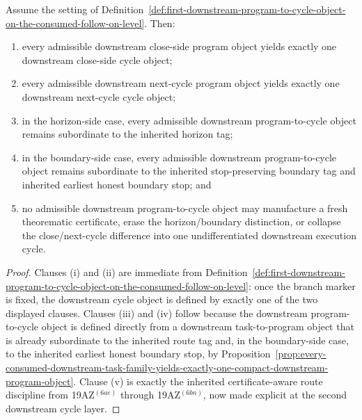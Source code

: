 \begin{proposition}
\label{prop:every-normalized-downstream-program-object-yields-exactly-one-controlled-downstream-cycle}
Assume the setting of Definition~\ref{def:first-downstream-program-to-cycle-object-on-the-consumed-follow-on-level}. Then:
\begin{enumerate}[label=(\roman*)]
  \item every admissible downstream close-side program object yields exactly one downstream close-side cycle object;
  \item every admissible downstream next-cycle program object yields exactly one downstream next-cycle cycle object;
  \item in the horizon-side case, every admissible downstream program-to-cycle object remains subordinate to the inherited horizon tag;
  \item in the boundary-side case, every admissible downstream program-to-cycle object remains subordinate to the inherited stop-preserving boundary tag and inherited earliest honest boundary stop; and
  \item no admissible downstream program-to-cycle object may manufacture a fresh theorematic certificate, erase the horizon/boundary distinction, or collapse the close/next-cycle difference into one undifferentiated downstream execution cycle.
\end{enumerate}
\end{proposition}

\begin{proof}
Clauses (i) and (ii) are immediate from Definition~\ref{def:first-downstream-program-to-cycle-object-on-the-consumed-follow-on-level}: once the branch marker is fixed, the downstream cycle object is defined by exactly one of the two displayed clauses. Clauses (iii) and (iv) follow because the downstream program-to-cycle object is defined directly from a downstream task-to-program object that is already subordinate to the inherited route tag and, in the boundary-side case, to the inherited earliest honest boundary stop, by Proposition~\ref{prop:every-consumed-downstream-task-family-yields-exactly-one-compact-downstream-program-object}. Clause (v) is exactly the inherited certificate-aware route discipline from 19AZ$^{(6ae)}$ through 19AZ$^{(6bn)}$, now made explicit at the second downstream cycle layer.
\end{proof}

